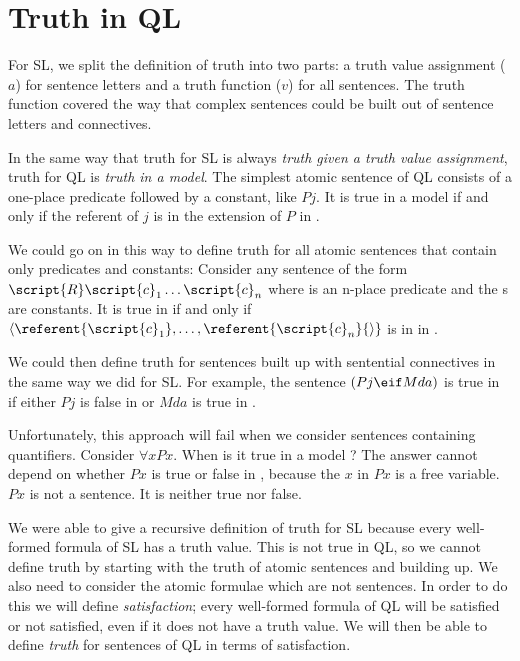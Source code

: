 

\section{Truth in QL}
\label{sec.TruthInQL}
For SL, we split the definition of truth into two parts: a truth value assignment ($a$) for sentence letters and a truth function ($v$) for all sentences. The truth function covered the way that complex sentences could be built out of sentence letters and connectives.

In the same way that truth for SL is always \emph{truth given a truth value assignment}, truth for QL is \emph{truth in a model}. The simplest atomic sentence of QL consists of a one-place predicate followed by a constant, like $Pj$. It is true in a model  if and only if the referent of $j$ is in the extension of $P$ in .

We could go on in this way to define truth for all atomic sentences that contain only predicates and constants: Consider any sentence of the form $\script{R}\script{c}_1\ldots\script{c}_n$ where  is an n-place predicate and the s are constants. It is true in  if and only if ${\langle}\referent{\script{c}_1},\ldots,\referent{\script{c}_n}{\rangle}$ is in  in .

We could then define truth for sentences built up with sentential connectives in the same way we did for SL. For example, the sentence $(Pj \eif Mda)$ is true in  if either $Pj$ is false in  or $Mda$ is true in .

Unfortunately, this approach will fail when we consider sentences containing quantifiers. Consider $\forall x Px$. When is it true in a model ? The answer cannot depend on whether $Px$ is true or false in , because the $x$ in $Px$ is a free variable. $Px$ is not a sentence. It is neither true nor false.

We were able to give a recursive definition of truth for SL because every well-formed formula of SL has a truth value. This is not true in QL, so we cannot define truth by starting with the truth of atomic sentences and building up. We also need to consider the atomic formulae which are not sentences. In order to do this we will define \emph{satisfaction}; every well-formed formula of QL will be satisfied or not satisfied, even if it does not have a truth value. We will then be able to define \emph{truth} for sentences of QL in terms of satisfaction.


